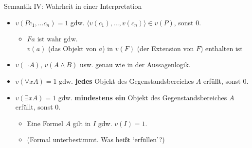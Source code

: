 \documentclass[12pt]{beamer}
\begin{document}
\begin{frame}{Semantik IV: Wahrheit in einer Interpretation}
  \begin{itemize}[<+->]
  \item $v(Pc_1,...c_n) = 1$ gdw.
    $\langle v(c_1),...,v(c_n)\rangle \in v(P)$, sonst 0.
    \begin{itemize}
    \item $Fa$ ist wahr gdw.\\ $v(a)$ (das Objekt von $a$) in $v(F)$
      (der Extension von $F$) enthalten ist
    \end{itemize}
  \item $v(\neg A)$, $v(A \land B)$ usw. genau wie in der
    Aussagenlogik.
  \end{itemize}

  \begin{itemize}[<+->]
    
  \item $v(\forall xA) = 1$ gdw. \textbf{jedes} Objekt des
    Gegenstandsbereiches $A$ erfüllt, sonst 0.
  \item $v(\exists xA) = 1$ gdw. \textbf{mindestens ein} Objekt des
    Gegenstandsbereiches $A$ erfüllt, sonst 0.
    \begin{itemize}
    \item Eine Formel $A$ gilt in $I$ gdw. $v(I) = 1$.
    \item (Formal unterbestimmt. Was heißt `erfüllen'?)
    \end{itemize}

  \end{itemize}

\end{frame}

\end{document}
